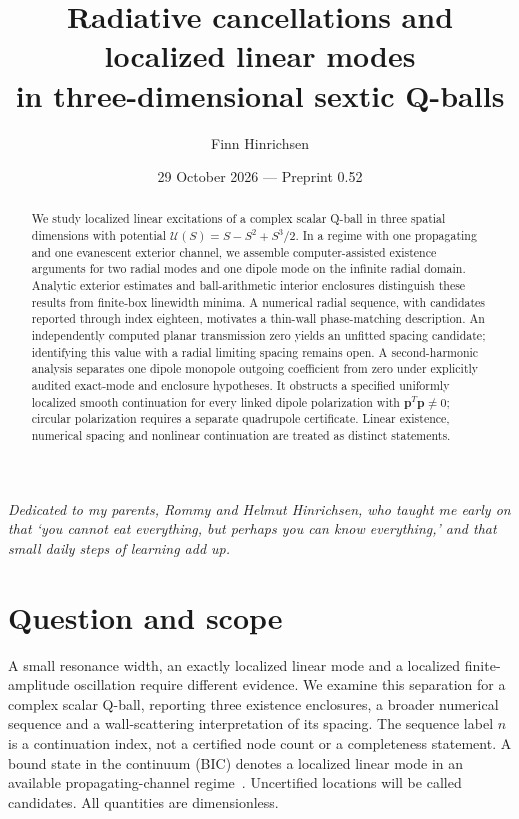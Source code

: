\documentclass[a4paper,11pt]{article}
\title{Radiative cancellations and localized linear modes\\in three-dimensional sextic Q-balls}
\author{Finn Hinrichsen}
\date{29 October 2026 --- Preprint 0.52}
\begin{document}
\maketitle
\begin{center}
{\small\emph{Dedicated to my parents, Rommy and Helmut Hinrichsen, who
taught me early on that ‘you cannot eat everything, but perhaps you can
know everything,’ and that small daily steps of learning add up.}}
\end{center}
\begin{abstract}
We study localized linear excitations of a complex scalar Q-ball in three
spatial dimensions with potential $\mathcal U(S)=S-S^2+S^3/2$.
In a regime with one propagating and one evanescent exterior channel,
we assemble computer-assisted existence arguments for two radial modes
and one dipole mode on the infinite radial domain. Analytic exterior
estimates and ball-arithmetic interior enclosures distinguish these
results from finite-box linewidth minima. A numerical radial sequence,
with candidates reported through index eighteen, motivates a thin-wall
phase-matching description. An independently computed planar transmission
zero yields an unfitted spacing candidate; identifying this value with
a radial limiting spacing remains open. A second-harmonic analysis
separates one dipole monopole outgoing coefficient from zero under
explicitly audited exact-mode and enclosure hypotheses. It obstructs a
specified uniformly localized smooth continuation for every linked dipole
polarization with $\boldsymbol p^T\boldsymbol p\ne0$; circular polarization
requires a separate quadrupole certificate. Linear existence, numerical
spacing and nonlinear continuation are treated as distinct statements.
\end{abstract}



\section{Question and scope}\label{sec:scope}
A small resonance width, an exactly localized linear mode and a localized
finite-amplitude oscillation require different evidence. We examine this
separation for a complex scalar Q-ball, reporting three existence
enclosures, a broader numerical sequence and a wall-scattering
interpretation of its spacing. The sequence label $n$ is a continuation
index, not a certified node count or a completeness statement.
A bound state in the continuum (BIC) denotes a localized linear mode in
an available propagating-channel regime~\cite{Hsu2016}. Uncertified
locations will be called candidates. All quantities are dimensionless.

\end{document}

